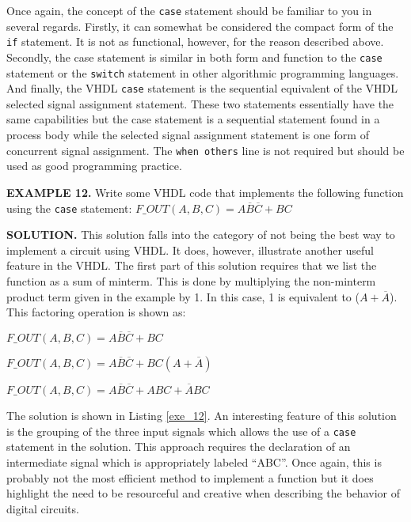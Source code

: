 Once again, the concept of the \texttt{case} statement should be familiar to you in several regards. Firstly, it can somewhat be considered the compact form of the \texttt{if} statement. It is not as functional, however, for the reason described above. Secondly, the case statement is similar in both form and function to the \texttt{case} statement or the \texttt{switch} statement in other algorithmic programming languages. And finally, the VHDL \texttt{case} statement is the sequential equivalent of the VHDL selected signal assignment statement. These two statements essentially have the same capabilities but the case statement is a sequential statement found in a process body while the selected signal assignment statement is one form of concurrent signal assignment. The  \texttt{when others} line is not required but should be used as good programming practice.

\begin{leftbar}
\noindent
\textbf{EXAMPLE 12.}
Write some VHDL code that implements the following function using the \texttt{case} statement:
$F\_OUT(A,B,C)=A\overline{B}\overline{C}+BC$
\end{leftbar}
\noindent
\textbf{SOLUTION.} This solution falls into the category of not being the best way to implement a circuit using VHDL. It does, however, illustrate another useful feature in the VHDL. The first part of this solution requires that we list the function as a sum of minterm. This is done by multiplying the non-minterm product term given in the example by 1. In this case, 1 is equivalent to ($A+\overline{A}$). This factoring operation is shown as:

$F\_OUT(A,B,C)=A\overline{B}\overline{C}+BC$

$F\_OUT(A,B,C)=A\overline{B}\overline{C}+BC (A+\overline{A})$

$F\_OUT(A,B,C)=A\overline{B}\overline{C}+ABC+\overline{A}BC$

The solution is shown in Listing \ref{exe_12}. An interesting feature of this solution is the grouping of the three input signals which allows the use of a \texttt{case} statement in the solution. This approach requires the declaration of an intermediate signal which is appropriately labeled ``ABC''. Once again, this is probably not the most efficient method to implement a function but it does highlight the need to be resourceful and creative when describing the behavior of digital circuits.

